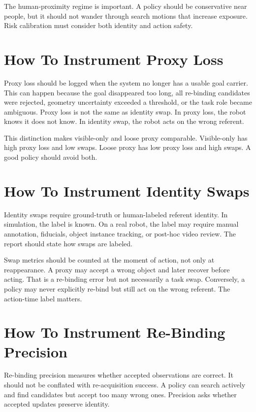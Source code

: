 The human-proximity regime is important. A policy should be conservative near people, but it should not wander through search motions that increase exposure. Risk calibration must consider both identity and action safety.

\section{How To Instrument Proxy Loss}

Proxy loss should be logged when the system no longer has a usable goal carrier. This can happen because the goal disappeared too long, all re-binding candidates were rejected, geometry uncertainty exceeded a threshold, or the task role became ambiguous. Proxy loss is not the same as identity swap. In proxy loss, the robot knows it does not know. In identity swap, the robot acts on the wrong referent.

This distinction makes visible-only and loose proxy comparable. Visible-only has high proxy loss and low swaps. Loose proxy has low proxy loss and high swaps. A good policy should avoid both.

\section{How To Instrument Identity Swaps}

Identity swaps require ground-truth or human-labeled referent identity. In simulation, the label is known. On a real robot, the label may require manual annotation, fiducials, object instance tracking, or post-hoc video review. The report should state how swaps are labeled.

Swap metrics should be counted at the moment of action, not only at reappearance. A proxy may accept a wrong object and later recover before acting. That is a re-binding error but not necessarily a task swap. Conversely, a policy may never explicitly re-bind but still act on the wrong referent. The action-time label matters.

\section{How To Instrument Re-Binding Precision}

Re-binding precision measures whether accepted observations are correct. It should not be conflated with re-acquisition success. A policy can search actively and find candidates but accept too many wrong ones. Precision asks whether accepted updates preserve identity.

